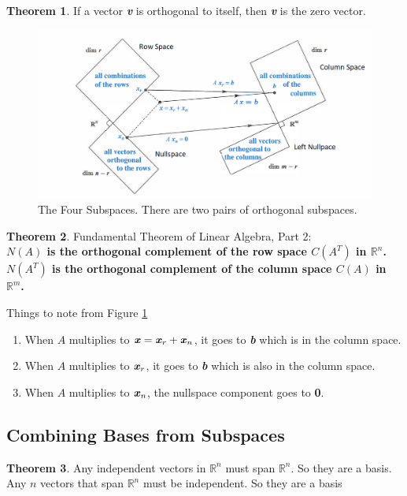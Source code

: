 \documentclass[12pt, letterpaper]{article}
\newcommand{\R}[1]{$\mathbb{R}^{#1}$}
\newcommand{\V}[1]{\textbf{\textit{#1}}}
\newcommand{\DefinitionSpace}{\vspace{15px}}
\theoremstyle{definition}
\newtheorem{theorem}{Theorem}
\begin{document}
	\DefinitionSpace
	\begin{theorem}
		If a vector \V{v} is orthogonal to itself, then \V{v} is the zero vector.
	\end{theorem}
	\DefinitionSpace
	
	\begin{figure}[h!]
		\centering
		\includegraphics[scale=0.5]{4-subspaces.png}
		\caption{The Four Subspaces. There are two pairs of orthogonal subspaces.}
		\label{4subs}
	\end{figure}

	\begin{theorem}
		Fundamental Theorem of Linear Algebra, Part 2: \\
		\quad\textbf{$N(A)$ is the orthogonal complement of the row space $C(A^T)$ in \R{n}. \\
		\quad $N(A^T)$ is the orthogonal complement of the column space $C(A)$ in \R{m}.}
	\end{theorem}\DefinitionSpace 

	Things to note from Figure \ref{4subs}
	\begin{enumerate}
		\item When $A$ multiplies to $\V{x} = \V{x}_r + \V{x}_n$, it goes to \V{b} which is in the column space.
		\item When $A$ multiplies to $\V{x}_r$, it goes to \V{b} which is also in the column space.
		\item When $A$ multiplies to $\V{x}_n$, the nullspace component goes to \textbf{0}.
	\end{enumerate}
	
	
	
\subsection{Combining Bases from Subspaces}
	\begin{theorem}
		Any independent vectors in \R{n} must span \R{n}. So they are a basis.\\
		Any $n$ vectors that span \R{n} must be independent. So they are a basis
	\end{theorem}\DefinitionSpace 
	
\end{document}
